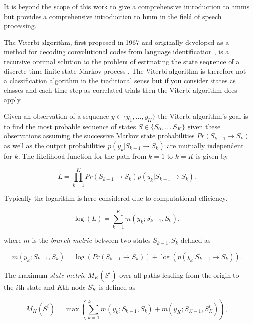 It is beyond the scope of this work to give a comprehensive introduction to \gls{hmm}s but \cite{Rabiner1989} provides a comprehensive introduction to \gls{hmm} in the field of speech processing.

The Viterbi algorithm, first proposed in 1967 \cite{Viterbi1967} and originally developed as a method for decoding convolutional codes
from language identification \cite{Nagarajan2004}, is a recursive optimal solution to the problem of estimating the state sequence of a discrete-time finite-state Markov process \cite{Forney1973}. The Viterbi algorithm is therefore not a classification algorithm in the traditional sense but if you consider states as classes and each time step as correlated trials then the Viterbi algorithm does apply.\label{corrections:viterbi}

Given an observation of a sequence $y \in \{y_1,\ldots,y_K\}$ the Viterbi algorithm's goal is to find the most probable sequence of states $S \in \{S_0,\ldots,S_K \}$ given these observations assuming the successive Markov state probabilities $Pr(S_{k-1} \rightarrow S_{k})$ as well as the output probabilities $p(y_k | S_{k-1} \rightarrow S_{k})$ are mutually independent for $k$. The likelihood function for the path from $k=1$ to $k=K$ is given by

\begin{equation}\label{eq:viterbiLitRev}
L = \prod_{k=1}^K Pr(S_{k-1} \rightarrow S_{k}) p(y_k | S_{k-1} \rightarrow S_{k}).
\end{equation}

Typically the logarithm is here considered due to computational efficiency.

\begin{equation}\label{eq:viterbiLitRev2}
\log{\left(L\right)} = \sum_{k=1}^K m(y_k ; S_{k-1}, S_{k}),
\end{equation}

where $m$ is the \emph{branch metric} between two states $S_{k-1}, S_{k}$ defined as

\begin{equation}\label{eq:viterbiLitRev3}
m(y_k ; S_{k-1}, S_{k}) = \log{\left( Pr(S_{k-1} \rightarrow S_{k}) \right)} + \log{\left( p(y_k | S_{k-1} \rightarrow S_{k}) \right)}.
\end{equation}

The maximum \emph{state metric} $M_K(S^i)$ over all paths leading from the origin to the $i$th state and $K$th node $S_K^i$ is defined as

\begin{equation}\label{eq:viterbiLitRev4}
M_K(S^i) = \max \left( \sum_{k=1}^{k-1} m(y_k ; S_{k-1}, S_{k}) + m(y_K ; S_{K-1}, S_{K}^i)\right),
\end{equation}

